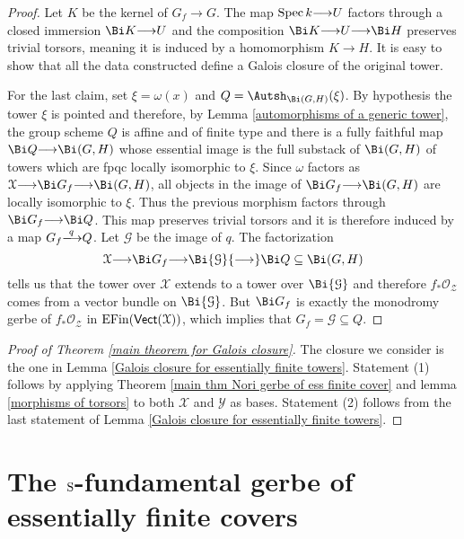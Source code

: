 \documentclass[12pt,reqno]{amsart}
\theoremstyle{plain}
\theoremstyle{definition}
\numberwithin{thm}{section}
\newcounter{x}\setcounter{x}{1}
\theoremstyle{plain}
\begin{document}
\begin{proof}
Let $K$  be the kernel of $G_f{\longrightarrow} G$. The map ${{\rm Spec \,}} k {\longrightarrow} U$ factors through a closed immersion $\Bi K{\longrightarrow} U$ and the composition $\Bi K{\longrightarrow} U{\longrightarrow} \Bi H$ preserves trivial torsors,
meaning it is induced by a homomorphism $K{\longrightarrow} H$. It is easy to show that all the data constructed define a Galois closure of the original tower.

For the last claim, set $\xi=\omega(x)$ and $Q=\Autsh_{\Bi(G,H)}(\xi)$. By hypothesis the tower
$\xi$ is pointed and therefore, by Lemma \ref{automorphisms of a generic tower}, the group scheme $Q$ is affine and of finite type and there is a fully faithful map $\Bi Q{\longrightarrow} \Bi(G,H)$ whose essential image is the full substack of $\Bi(G,H)$ of towers which are fpqc locally isomorphic to $\xi$. Since $\omega$ factors as ${\mathcal{X}}{\longrightarrow} \Bi G_f{\longrightarrow} \Bi(G,H)$, all objects in the image of $\Bi G_f{\longrightarrow} \Bi(G,H)$ are locally isomorphic to $\xi$. Thus the previous morphism factors through $\Bi G_f {\longrightarrow} \Bi Q$. This map preserves trivial torsors and it is therefore induced by a map $G_f{\xlongrightarrow{q}} Q$. Let ${\mathcal{G}}$ be the image of $q$. The factorization
\[
{\mathcal{X}}{\longrightarrow} \Bi G_f {\longrightarrow} \Bi {\mathcal{G}} {\longrightarrow} \Bi Q \subseteq \Bi(G,H)
\]
tells us that the tower over ${\mathcal{X}}$ extends to a tower over $\Bi {\mathcal{G}}$ and therefore $f_*{\mathcal{O}_{\mathcal{Z}}}$
comes from a vector bundle on $\Bi {\mathcal{G}}$. But $\Bi G_f$ is exactly the monodromy gerbe of
$f_*{\mathcal{O}_{\mathcal{Z}}}$ in ${{\rm EFin}}({\text{\sf Vect}}({\mathcal{X}}))$, which implies that $G_f = {\mathcal{G}} \subseteq Q$.
\end{proof}

\begin{proof}[Proof of Theorem \ref{main theorem for Galois closure}]
The closure we consider is the one in Lemma \ref{Galois closure for essentially finite towers}.
Statement (1) follows by applying Theorem \ref{main thm Nori gerbe of ess finite cover} and
lemma \ref{morphisms of torsors} to both ${\mathcal{X}}$ and ${\mathcal{Y}}$ as bases. Statement (2) follows from the
last statement  of Lemma \ref{Galois closure for essentially finite towers}.
\end{proof}

\section{The ${\textup{S}}$-fundamental gerbe of essentially finite covers}
\end{document}
